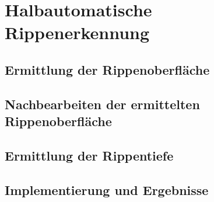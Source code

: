 \chapter{Halbautomatische Rippenerkennung}
\label{cha:segment}
	
\section{Ermittlung der Rippenoberfl\"ache}

\section{Nachbearbeiten der ermittelten Rippenoberfl\"ache}

\section{Ermittlung der Rippentiefe}

\section{Implementierung und Ergebnisse}

